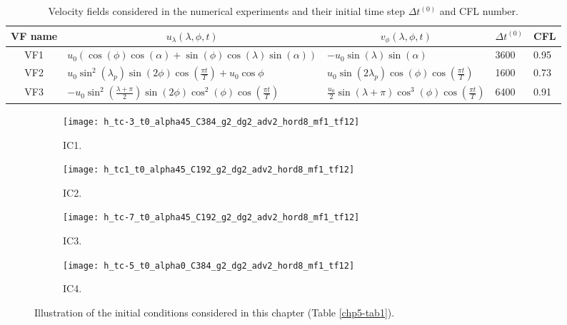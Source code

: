 \begin{table}[!ht]
	\begin{tabular}{|c|l|l|l|l|}
		\hline
		VF name & \multicolumn{1}{c|}{$u_\lambda(\lambda,\phi,t)$} & \multicolumn{1}{c|}{$v_\phi(\lambda,\phi,t)$}
		& \multicolumn{1}{c|}{$\Delta t^{(0)}$}	& \multicolumn{1}{c|}{CFL} \\ \hline
		VF1   & $u_0(\cos(\phi)\cos(\alpha) + \sin(\phi)\cos(\lambda)\sin(\alpha))$ 
		& $-u_0\sin(\lambda)\sin(\alpha)$ & 3600 & 0.95 \\ \hline
		VF2   & $u_0\sin^2(\lambda_p)\sin(2\phi)\cos(\frac{\pi t}{T})+u_0\cos\phi$ 
		& $u_0\sin(2\lambda_p)\cos(\phi)\cos(\frac{\pi t}{T})$& 1600 &0.73 \\ \hline
		VF3   & $-u_0\sin^2(\frac{\lambda+\pi}{2})\sin(2\phi)\cos^2(\phi)\cos(\frac{\pi t}{T})$ 
		& $\frac{u_0}{2}\sin(\lambda+\pi)\cos^3(\phi)\cos(\frac{\pi t}{T})$ & 6400 &0.91 \\ \hline
	\end{tabular}
	\caption{Velocity fields considered in the numerical experiments and their initial time step $\Delta t^{(0)}$ and CFL number.}
	\label{chp5-vf}
\end{table}

\begin{figure}[!htb]
	\centering
	\begin{subfigure}{0.45\textwidth}
		\centering
		\texttt{[image: h\_tc-3\_t0\_alpha45\_C384\_g2\_dg2\_adv2\_hord8\_mf1\_tf12]}
		\caption{IC1. \label{chp5-ic1}}
	\end{subfigure}
	\begin{subfigure}{0.45\textwidth}
		\centering
		\texttt{[image: h\_tc1\_t0\_alpha45\_C192\_g2\_dg2\_adv2\_hord8\_mf1\_tf12]}
		\caption{IC2. \label{chp5-ic2}}
	\end{subfigure}

	\begin{subfigure}{0.45\textwidth}
	\centering
	\texttt{[image: h\_tc-7\_t0\_alpha45\_C192\_g2\_dg2\_adv2\_hord8\_mf1\_tf12]}
	\caption{IC3. \label{chp5-ic3}}
    \end{subfigure}
    \begin{subfigure}{0.45\textwidth}
	\centering
	\texttt{[image: h\_tc-5\_t0\_alpha0\_C384\_g2\_dg2\_adv2\_hord8\_mf1\_tf12]}
	\caption{IC4. \label{chp5-ic4}}
    \end{subfigure}
	\caption{ Illustration of the initial conditions considered in this chapter (Table \ref{chp5-tab1}).\label{chp5-ic}}
\end{figure}


